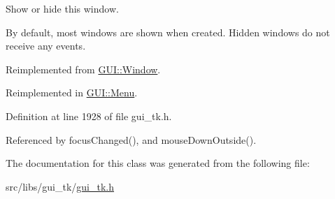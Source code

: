 Show or hide this window. 

By default, most windows are shown when created. Hidden windows do not receive any events. 

Reimplemented from \hyperlink{classGUI_1_1Window_a7cd474e3c89ff37a4295da00f3624cc7}{G\-U\-I\-::\-Window}.



Reimplemented in \hyperlink{classGUI_1_1Menu_aa98bb7305b74088dd875ead6747cfa52}{G\-U\-I\-::\-Menu}.



Definition at line 1928 of file gui\-\_\-tk.\-h.



Referenced by focus\-Changed(), and mouse\-Down\-Outside().



The documentation for this class was generated from the following file\-:\begin{DoxyCompactItemize}
\item 
src/libs/gui\-\_\-tk/\hyperlink{gui__tk_8h}{gui\-\_\-tk.\-h}\end{DoxyCompactItemize}
